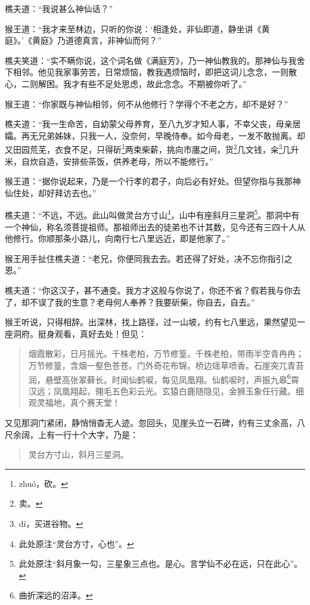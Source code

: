 \documentclass[12pt,UTF8]{ctexbook}
\begin{document}
樵夫道：“我说甚么神仙话？”

猴王道：“我才来至林边，只听的你说：‘相逢处，非仙即道，静坐讲《黄庭》。’《黄庭》乃道德真言，非神仙而何？”

樵夫笑道：“实不瞒你说，这个词名做《满庭芳》，乃一神仙教我的。那神仙与我舍下相邻。他见我家事劳苦，日常烦恼，教我遇烦恼时，即把这词儿念念，一则散心，二则解困。我才有些不足处思虑，故此念念。不期被你听了。”

猴王道：“你家既与神仙相邻，何不从他修行？学得个不老之方，却不是好？”

樵夫道：“我一生命苦，自幼蒙父母养育，至八九岁才知人事，不幸父丧，母亲居孀。再无兄弟姊妹，只我一人，没奈何，早晚侍奉。如今母老，一发不敢抛离。却又田园荒芜，衣食不足，只得斫\footnote{zhu\'o，砍。}两束柴薪，挑向市廛之间，货\footnote{卖。}几文钱，籴\footnote{d\'i，买进谷物。}几升米，自炊自造，安排些茶饭，供养老母，所以不能修行。”

猴王道：“据你说起来，乃是一个行孝的君子，向后必有好处。但望你指与我那神仙住处，却好拜访去也。”

樵夫道：“不远，不远。此山叫做灵台方寸山\footnote{此处原注“灵台方寸，心也”。}，山中有座斜月三星洞\footnote{此处原注“斜月象一勾，三星象三点也。是心。言学仙不必在远，只在此心”。}。那洞中有一个神仙，称名须菩提祖师。那祖师出去的徒弟也不计其数，见今还有三四十人从他修行。你顺那条小路儿，向南行七八里远近，即是他家了。”

猴王用手扯住樵夫道：“老兄，你便同我去去。若还得了好处，决不忘你指引之恩。”

樵夫道：“你这汉子，甚不通变。我方才这般与你说了，你还不省？假若我与你去了，却不误了我的生意？老母何人奉养？我要斫柴，你自去，自去。”

猴王听说，只得相辞。出深林，找上路径，过一山坡，约有七八里远，果然望见一座洞府。挺身观看，真好去处！但见：

\begin{quotation}
烟霞散彩，日月摇光。千株老柏，万节修篁。千株老柏，带雨半空青冉冉；万节修篁，含烟一壑色苍苍。门外奇花布锦，桥边瑶草喷香。石崖突兀青苔润，悬壁高张翠藓长。时闻仙鹤唳，每见凤凰翔。仙鹤唳时，声振九皋\footnote{曲折深远的沼泽。}霄汉远；凤凰翔起，翎毛五色彩云光。玄猿白鹿随隐见，金狮玉象任行藏。细观灵福地，真个赛天堂！
\end{quotation}

又见那洞门紧闭，静悄悄杳无人迹。忽回头，见崖头立一石碑，约有三丈余高，八尺余阔，上有一行十个大字，乃是：

\begin{quotation}
灵台方寸山，斜月三星洞。
\end{quotation}
\end{document}
